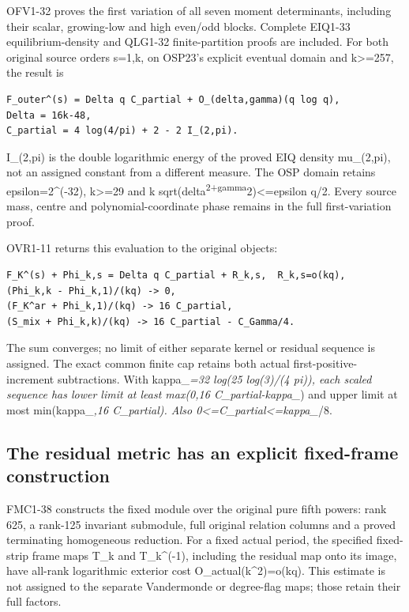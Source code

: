 \documentclass[
]{article}
\begin{document}
OFV1-32 proves the first variation of all seven moment determinants,
including their scalar, growing-low and high even/odd blocks. Complete
EIQ1-33 equilibrium-density and QLG1-32 finite-partition proofs are
included. For both original source orders s=1,k, on OSP23's explicit
eventual domain and k\textgreater=257, the result is

\begin{verbatim}
F_outer^(s) = Delta q C_partial + O_(delta,gamma)(q log q),
Delta = 16k-48,
C_partial = 4 log(4/pi) + 2 - 2 I_(2,pi).
\end{verbatim}

I\_(2,pi) is the double logarithmic energy of the proved EIQ density
mu\_(2,pi), not an assigned constant from a different measure. The OSP
domain retains epsilon=2\^{}(-32), k\textgreater=29 and k
sqrt(delta\textsuperscript{2+gamma}2)\textless=epsilon q/2. Every source
mass, centre and polynomial-coordinate phase remains in the full
first-variation proof.

OVR1-11 returns this evaluation to the original objects:

\begin{verbatim}
F_K^(s) + Phi_k,s = Delta q C_partial + R_k,s,  R_k,s=o(kq),
(Phi_k,k - Phi_k,1)/(kq) -> 0,
(F_K^ar + Phi_k,1)/(kq) -> 16 C_partial,
(S_mix + Phi_k,k)/(kq) -> 16 C_partial - C_Gamma/4.
\end{verbatim}

The sum converges; no limit of either separate kernel or residual
sequence is assigned. The exact common finite cap retains both actual
first-positive- increment subtractions. With kappa\_\emph{=32 log(25
log(3)/(4 pi)), each scaled sequence has lower limit at least max(0,16
C\_partial-kappa\_}) and upper limit at most min(kappa\_\emph{,16
C\_partial). Also 0\textless=C\_partial\textless=kappa\_}/8.

\subsection{The residual metric has an explicit fixed-frame
construction}\label{the-residual-metric-has-an-explicit-fixed-frame-construction}

FMC1-38 constructs the fixed module over the original pure fifth powers:
rank 625, a rank-125 invariant submodule, full original relation columns
and a proved terminating homogeneous reduction. For a fixed actual
period, the specified fixed-strip frame maps T\_k and T\_k\^{}(-1),
including the residual map onto its image, have all-rank logarithmic
exterior cost O\_actual(k\^{}2)=o(kq). This estimate is not assigned to
the separate Vandermonde or degree-flag maps; those retain their full
factors.
\end{document}
